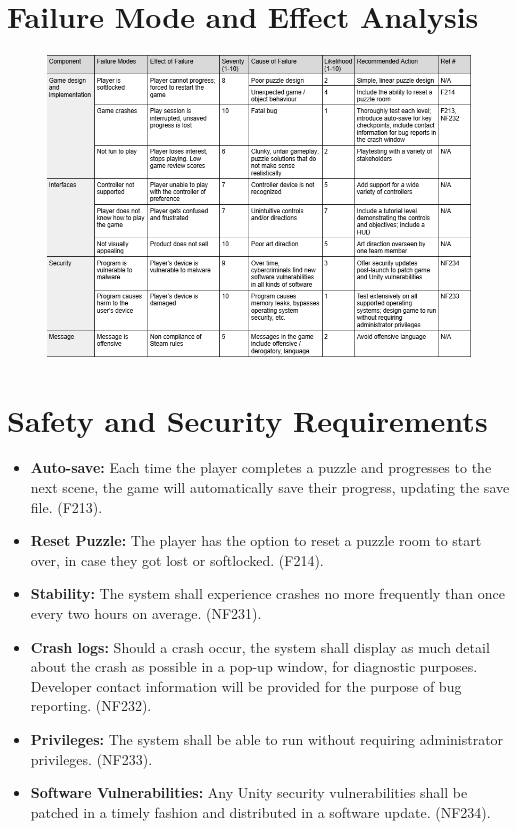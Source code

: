 \documentclass{article}
\begin{document}
\section{Failure Mode and Effect Analysis}

\begin{figure}[h!]
	\includegraphics[width=\linewidth]{FMEA.png}
\end{figure}

\section{Safety and Security Requirements}

\begin{itemize}
\item{\textbf{Auto-save:} Each time the player completes a puzzle and progresses to the next scene, the game will automatically save their progress, updating the save file. (F213).}
\item{\textbf{Reset Puzzle:} The player has the option to reset a puzzle room to start over, in case they got lost or softlocked. (F214).}
\item{\textbf{Stability:} The system shall experience crashes no more frequently than once every two hours on average. (NF231).}
\item{\textbf{Crash logs:} Should a crash occur, the system shall display as much detail about the crash as possible in a pop-up window, for diagnostic purposes. Developer contact information will be provided for the purpose of bug reporting. (NF232).}
\item{\textbf{Privileges:} The system shall be able to run without requiring administrator privileges. (NF233).}
\item{\textbf{Software Vulnerabilities:} Any Unity security vulnerabilities shall be patched in a timely fashion and distributed in a software update. (NF234).}
\end{itemize}
\end{document}
